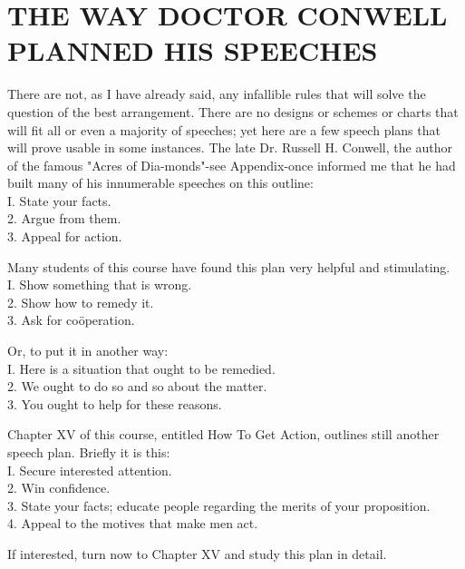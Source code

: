 \documentclass[10pt]{article}
\begin{document}
\section*{THE WAY DOCTOR CONWELL PLANNED HIS SPEECHES}
There are not, as I have already said, any infallible rules that will solve the question of the best arrangement. There are no designs or schemes or charts that will fit all or even a majority of speeches; yet here are a few speech plans that will prove usable in some instances. The late Dr. Russell H. Conwell, the author of the famous "Acres of Dia-monds"-see Appendix-once informed me that he had built many of his innumerable speeches on this outline:\\
I. State your facts.\\
2. Argue from them.\\
3. Appeal for action.

Many students of this course have found this plan very helpful and stimulating.\\
I. Show something that is wrong.\\
2. Show how to remedy it.\\
3. Ask for coöperation.

Or, to put it in another way:\\
I. Here is a situation that ought to be remedied.\\
2. We ought to do so and so about the matter.\\
3. You ought to help for these reasons.

Chapter XV of this course, entitled How To Get Action, outlines still another speech plan. Briefly it is this:\\
I. Secure interested attention.\\
2. Win confidence.\\
3. State your facts; educate people regarding the merits of your proposition.\\
4. Appeal to the motives that make men act.

If interested, turn now to Chapter XV and study this plan in detail.
\end{document}
